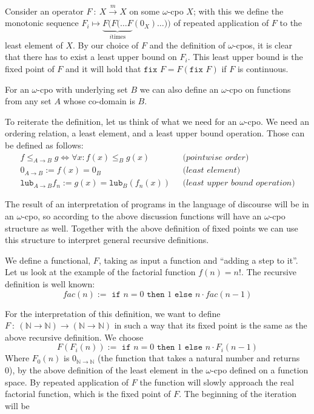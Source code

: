 \documentclass[11pt, leqno]{article}
\theoremstyle{definition}
\begin{document}
Consider an operator $F~:~X \xrightarrow{m} X$ on some $\omega$-cpo $X$; with this we
define the monotonic sequence $F_i \mapsto \underbrace{ F(F(\dots F}_{i \text{
    times}} (0_X) \dots))$ of repeated application of $F$ to the least element of $X$.
By our choice of $F$ and the definition of $\omega$-cpos, it is clear that there has
to exist a least upper bound on $F_i$. This least upper bound is the fixed point of
$F$ and it will hold that $\texttt{fix } F = F(\texttt{fix }F)$ if $F$ is
continuous. 

For an $\omega$-cpo with underlying set $B$ we can also define an $\omega$-cpo on
functions from any set $A$ whose co-domain is $B$.

To reiterate the definition, let us think of what we need for an $\omega$-cpo. We
need an ordering relation, a least element, and a least upper bound operation. Those
can be defined as follows:
\begin{align*}
  f\leq_{A \to B} g \Leftrightarrow \forall x: f(x) \leq_B g(x) & ~~~\textit{(pointwise order)}\\
  0_{A\to B} := f(x) = 0_B & ~~~\textit{(least element)}\\
  \texttt{lub}_{A\to B} f_n := g(x) = \texttt{lub}_B(f_n(x)) & ~~~\textit{(least upper
                                                               bound operation)}
\end{align*}


The result of an interpretation of programs in the language of discourse will be in
an $\omega$-cpo, so according to the above discussion functions will have an
$\omega$-cpo structure as well. Together with the above definition of fixed points we
can use this structure to interpret general recursive definitions. 

We define a functional, $F$, taking as input a function and ``adding a step to it''.
Let us look at the example of the factorial function $f(n) = n!$. %
The recursive definition is well known:
$$fac(n) := \texttt{ if } n = 0 \texttt{ then }1\texttt{ else } n\cdot fac(n-1)$$

For the interpretation of this definition, we want to define $F~:~(\mathbb{N} \to
\mathbb{N}) \to (\mathbb{N} \to \mathbb{N})$ in such a way that its fixed point is
the same as the above recursive definition. We choose
$$F(F_i(n)):=\texttt{ if }n=0\texttt{ then }1\texttt{ else }n\cdot F_i(n-1)$$
Where $F_0(n)$ is $0_{\mathbb{N} \to \mathbb{N}}$ (the function that takes a natural
number and returns 0), by the above definition of the least element in the
$\omega$-cpo defined on a function space. By repeated application of $F$ the function
will slowly approach the real factorial function, which is the fixed point of $F$.
The beginning of the iteration will be
\end{document}

